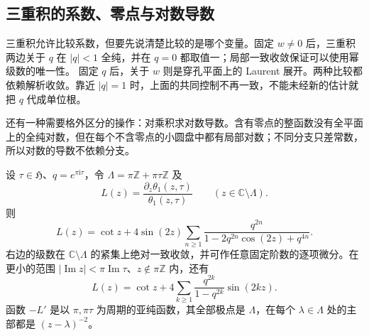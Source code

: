 \subsection{三重积的系数、零点与对数导数}
\label{b3:subsec:240204}

三重积允许比较系数，但要先说清楚比较的是哪个变量。固定
\(w\ne0\) 后，三重积两边关于 \(q\) 在 \(|q|<1\) 全纯，并在
\(q=0\) 都取值一；局部一致收敛保证可以使用幂级数的唯一性。
固定 \(q\) 后，关于 \(w\) 则是穿孔平面上的 Laurent 展开。两种比较都依赖解析收敛。靠近 \(|q|=1\) 时，上面的共同控制不再一致，不能未经新的估计就把 \(q\) 代成单位根。

还有一种需要格外区分的操作：对乘积求对数导数。含有零点的整函数没有全平面上的全纯对数，但在每个不含零点的小圆盘中都有局部对数；不同分支只差常数，所以对数的导数不依赖分支。

\begin{proposition}\label{b3:prop:24-theta-log-derivative}
设 \(\tau\in\mathfrak H\)、\(q=e^{\pi\mathrm i\tau}\)，令
\(\Lambda=\pi\mathbb Z+\pi\tau\mathbb Z\) 及
\[
 L(z)=\frac{\partial_z\theta_1(z,\tau)}{\theta_1(z,\tau)}
 \qquad(z\in\mathbb C\setminus\Lambda).
\]
则
\begin{equation}\label{b3:eq:24-theta-logarithmic-series}
 L(z)=\cot z+
 4\sin(2z)\sum_{n\ge1}
 \frac{q^{2n}}{1-2q^{2n}\cos(2z)+q^{4n}}.
\end{equation}
右边的级数在 \(\mathbb C\setminus\Lambda\) 的紧集上绝对一致收敛，并可作任意固定阶数的逐项微分。在更小的范围
\(|\operatorname{Im}z|<\pi\operatorname{Im}\tau\)、\(z\notin\pi\mathbb Z\) 内，还有
\begin{equation}\label{b3:eq:24-theta-log-fourier}
 L(z)=\cot z+
 4\sum_{k\ge1}\frac{q^{2k}}{1-q^{2k}}\sin(2kz).
\end{equation}
函数 \(-L'\) 是以 \(\pi,\pi\tau\) 为周期的亚纯函数，其全部极点是
\(\Lambda\)，在每个 \(\lambda\in\Lambda\) 处的主部都是
\((z-\lambda)^{-2}\)。
\end{proposition}
